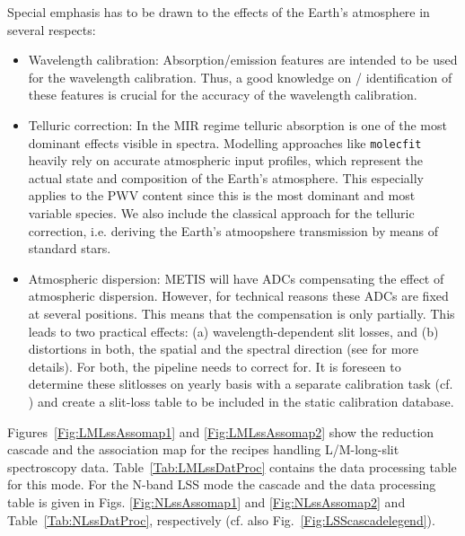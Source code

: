 Special emphasis has to be drawn to the effects of the Earth's
atmosphere in several respects:
\begin{itemize}
\item Wavelength calibration: Absorption/emission features are intended to be
  used for the wavelength calibration. Thus, a good knowledge on /
  identification of these features is crucial for the accuracy of the
  wavelength calibration.
\item Telluric correction: In the MIR regime telluric absorption is
  one of the most dominant effects visible in spectra. Modelling
  approaches like \texttt{molecfit} heavily rely on accurate
  atmospheric input profiles, which represent the actual state and
  composition of the Earth's atmosphere. This especially applies to
  the \ac{PWV} content since this is the most dominant and most variable species. We also include the classical approach for the telluric correction, i.e. deriving the Earth's atmoopshere transmission by means of standard stars.
\item Atmospheric dispersion: \ac{METIS} will have \ac{ADC}s compensating the
  effect of atmospheric dispersion. However, for technical reasons
  these ADCs are fixed at several positions. This means that the
  compensation is only partially. This leads to two practical effects:
  (a) wavelength-dependent slit losses, and (b) distortions in both,
  the spatial and the spectral direction (see \cite{METIS-ADC_study}
  for more details). For both, the pipeline needs to correct
  for. It is foreseen to determine these slitlosses on yearly basis with a separate calibration task (cf. \cite{METIS-calibration_plan}) and create a slit-loss table to be included in the static calibration database.
\end{itemize}


Figures~\ref{Fig:LMLssAssomap1} and \ref{Fig:LMLssAssomap2} show the reduction cascade and the association map for the recipes handling L/M-long-slit
spectroscopy data.  Table~\ref{Tab:LMLssDatProc} contains the data processing table for this mode. For the N-band \ac{LSS} mode the cascade and the data processing table is given in Figs. \ref{Fig:NLssAssomap1} and \ref{Fig:NLssAssomap2} and Table~\ref{Tab:NLssDatProc}, respectively (cf. also Fig.~\ref{Fig:LSScascadelegend}).

